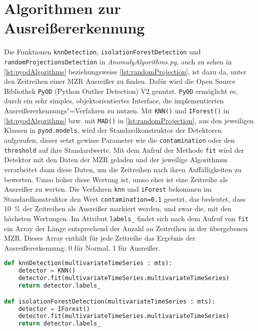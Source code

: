 \section{Algorithmen zur Ausreißererkennung}
Die Funktionen \lstinline|knnDetection|, \lstinline|isolationForestDetection| und \texttt{randomProjectionsDetec\allowbreak tion} in \textit{AnomalyAlgorithms.py}, auch zu sehen in \autoref{lst:pyodAlgorithms} beziehungsweise \autoref{lst:randomProjection}, ist dazu da, unter den Zeitreihen einer \ac{MZR} Ausreißer zu finden. Dafür wird die Open Source Bibliothek \lstinline|PyOD| (Python Outlier Detection) V2 \cite{pyod} genutzt. \lstinline|PyOD| ermöglicht es, durch ein sehr simples, objektorientiertes Interface, die implementierten Ausreißererkennungs"=Verfahren zu nutzen. Mit \lstinline|KNN()| und \lstinline|IForest()| in \autoref{lst:pyodAlgorithms} bzw. mit \lstinline|MAD()| in \autoref{lst:randomProjection}, aus den jeweiligen Klassen in \lstinline|pyod.models|, wird der Standardkonstruktor der Detektoren aufgerufen, dieser setzt gewisse Parameter wie die \lstinline|contamination| oder den \lstinline|threshold| auf ihre Standardwerte. Mit dem Aufruf der Methode \lstinline|fit| wird der Detektor mit den Daten der \ac{MZR} geladen und der jeweilige Algorithmus verarbeitet dann diese Daten, um die Zeitreihen nach ihren Auffälligkeiten zu bewerten. Umso höher diese Wertung ist, umso eher ist eine Zeitreihe als Ausreißer zu werten. Die Verfahren \lstinline|knn| und \lstinline|iForest| bekommen im Standardkonstruktor den Wert \lstinline|contamination=0.1| gesetzt, das bedeutet, dass 10~\% der Zeitreihen als Ausreißer markiert werden, und zwar die, mit den höchsten Wertungen. Im Attribut \lstinline|labels_| findet sich nach dem Aufruf von \lstinline|fit| ein Array der Länge entsprechend der Anzahl an Zeitreihen in der übergebenen \ac{MZR}. Dieses Array enthält für jede Zeitreihe das Ergebnis der Ausreißererkennung: 0 für Normal, 1 für Ausreißer.
\begin{lstlisting}[caption=Stückweise polynomielle Approximation, label=lst:pyodAlgorithms, style=Python, language=Python]
def knnDetection(multivariateTimeSeries : mts):
    detector = KNN()
    detector.fit(multivariateTimeSeries.multivariateTimeSeries)
    return detector.labels_

def isolationForestDetection(multivariateTimeSeries : mts):
    detector = IForest()
    detector.fit(multivariateTimeSeries.multivariateTimeSeries)
    return detector.labels_
\end{lstlisting}

